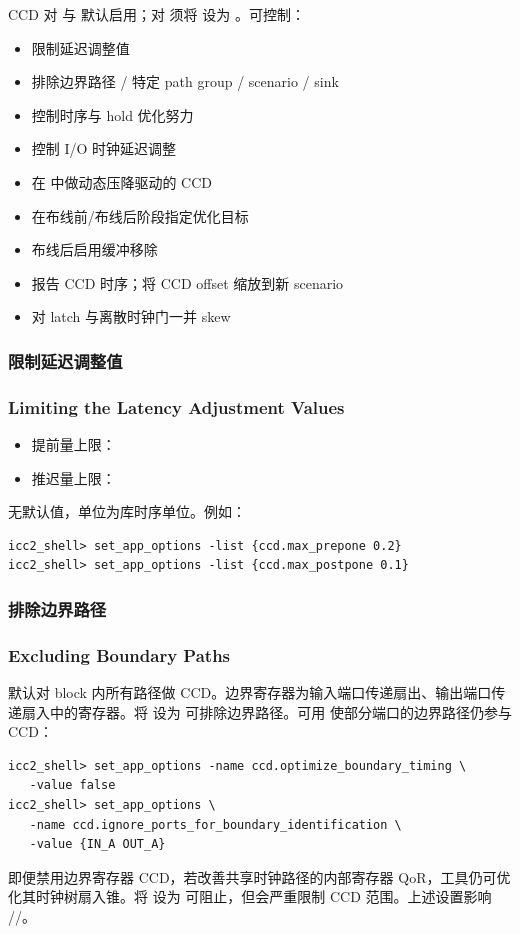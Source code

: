 CCD 对  与  默认启用；对  须将  设为 。可控制：
\begin{itemize}
  \item 限制延迟调整值
  \item 排除边界路径 / 特定 path group / scenario / sink
  \item 控制时序与 hold 优化努力
  \item 控制 I/O 时钟延迟调整
  \item 在  中做动态压降驱动的 CCD
  \item 在布线前/布线后阶段指定优化目标
  \item 布线后启用缓冲移除
  \item 报告 CCD 时序；将 CCD offset 缩放到新 scenario
  \item 对 latch 与离散时钟门一并 skew
\end{itemize}

\subsubsection{限制延迟调整值}
\subsubsection*{Limiting the Latency Adjustment Values}

\begin{itemize}
  \item 提前量上限：
  \item 推迟量上限：
\end{itemize}
无默认值，单位为库时序单位。例如：
\begin{lstlisting}
icc2_shell> set_app_options -list {ccd.max_prepone 0.2}
icc2_shell> set_app_options -list {ccd.max_postpone 0.1}
\end{lstlisting}

\subsubsection{排除边界路径}
\subsubsection*{Excluding Boundary Paths}

默认对 block 内所有路径做 CCD。边界寄存器为输入端口传递扇出、输出端口传递扇入中的寄存器。将  设为  可排除边界路径。可用  使部分端口的边界路径仍参与 CCD：
\begin{lstlisting}
icc2_shell> set_app_options -name ccd.optimize_boundary_timing \
   -value false
icc2_shell> set_app_options \
   -name ccd.ignore_ports_for_boundary_identification \
   -value {IN_A OUT_A}
\end{lstlisting}
即便禁用边界寄存器 CCD，若改善共享时钟路径的内部寄存器 QoR，工具仍可优化其时钟树扇入锥。将  设为  可阻止，但会严重限制 CCD 范围。上述设置影响 //。

